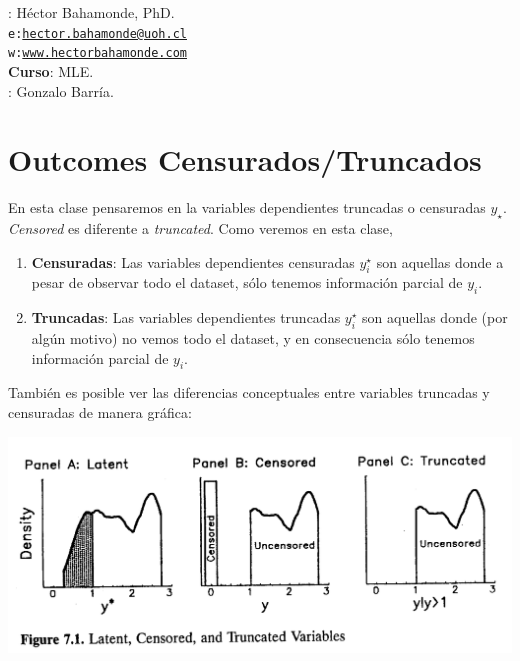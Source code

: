 \documentclass[onesided]{article}\usepackage[]{graphicx}\usepackage[]{color}
\makeatletter
\def\maxwidth{ %
  \ifdim\Gin@nat@width>\linewidth
    \linewidth
  \else
    \Gin@nat@width
  \fi
}
\makeatother
\begin{document}











\hspace{-5mm}{\bf Profesor}: H\'ector Bahamonde, PhD.\\
\texttt{e:}\href{mailto:hector.bahamonde@uoh.cl}{\texttt{hector.bahamonde@uoh.cl}}\\
\texttt{w:}\href{http://www.hectorbahamonde.com}{\texttt{www.hectorbahamonde.com}}\\
{\bf Curso}: MLE.\\
\hspace{-5mm}{\bf TA}: Gonzalo Barr\'ia.

\section{Outcomes Censurados/Truncados}

En esta clase pensaremos en la variables dependientes truncadas o censuradas $y_{\star}$. \emph{Censored} es diferente a \emph{truncated}. Como veremos en esta clase,

\begin{enumerate}
  \item {\bf Censuradas}: Las variables dependientes censuradas $y^{\star}_{i}$ son aquellas donde a pesar de observar todo el dataset, s\'olo tenemos informaci\'on parcial de $y_{i}$.
  \item {\bf Truncadas}: Las variables dependientes truncadas $y^{\star}_{i}$ son aquellas donde (por alg\'un motivo) no vemos todo el dataset, y en consecuencia s\'olo tenemos informaci\'on parcial de $y_{i}$.
\end{enumerate}

Tambi\'en es posible ver las diferencias conceptuales entre variables truncadas y censuradas de manera gr\'afica:

{\centering \includegraphics[width=\maxwidth]{fig_7_1.png}}
\end{document}
